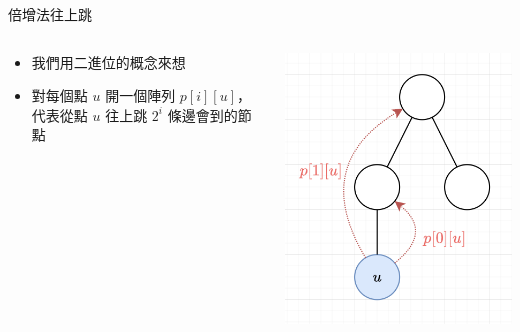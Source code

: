\documentclass[aspectratio=169]{beamer}
\begin{document}
    \begin{frame}{倍增法往上跳}
        \begin{columns}
            \begin{column}{0.65 \textwidth}
                \begin{itemize}
                    \item 我們用二進位的概念來想
                    \item 對每個點 $u$ 開一個陣列 $p[i][u]$，代表從點 $u$ 往上跳 $2^i$ 條邊會到的節點
                \end{itemize}
            \end{column}
            \begin{column}{0.4 \textwidth}
                \begin{center}
                    \includegraphics[scale=0.3]{images/binary_lifting.png}
                \end{center}
            \end{column}
        \end{columns}
    \end{frame}
    
\end{document}
